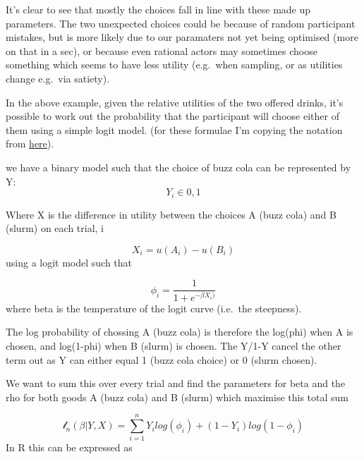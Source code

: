 \documentclass[]{article}
\begin{document}
It's clear to see that mostly the choices fall in line with these made
up parameters. The two unexpected choices could be because of random
participant mistakes, but is more likely due to our paramaters not yet
being optimised (more on that in a sec), or because even rational actors
may sometimes choose something which seems to have less utility
(e.g.~when sampling, or as utilities change e.g.~via satiety).

In the above example, given the relative utilities of the two offered
drinks, it's possible to work out the probability that the participant
will choose either of them using a simple logit model. (for these
formulae I'm copying the notation from
\href{https://imai.fas.harvard.edu/teaching/files/discrete.pdf}{here}).

we have a binary model such that the choice of buzz cola can be
represented by Y: \[Y_{i} \in {0,1}\]

Where X is the difference in utility between the choices A (buzz cola)
and B (slurm) on each trial, i

\[X_{i} = u(A_{i}) - u(B_{i})\] using a logit model such that

\[\phi_{i} = \frac{1}{1 + e^{-\beta X_{i})}}\] where beta is the
temperature of the logit curve (i.e.~the steepness).

The log probability of chossing A (buzz cola) is therefore the log(phi)
when A is chosen, and log(1-phi) when B (slurm) is chosen. The Y/1-Y
cancel the other term out as Y can either equal 1 (buzz cola choice) or
0 (slurm chosen).

We want to sum this over every trial and find the parameters for beta
and the rho for both goods A (buzz cola) and B (slurm) which maximise
this total sum

\[\mathcal l_{n}(\beta|Y,X) = \sum_{i=1}^{n} Y_{i} log(\phi_{i}) + (1-Y_{i})log(1-\phi_{i})\]
In R this can be expressed as
\end{document}
